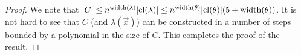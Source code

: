 \documentclass[../paper.tex]{subfiles}
\begin{document}
\begin{proof}
We note that $\vert C \vert \leq n^{\mathrm{width}(\lambda)} \vert \mathrm{cl}(\lambda) \vert
\leq n^{\mathrm{width}(\theta)} \vert \mathrm{cl}(\theta) \vert (5 + \mathrm{width}(\theta))$. It is not
hard to see that $C$ (and $\lambda(\vec{x})$) can be constructed in a number of
steps bounded by a polynomial in the size of $C$. This completes the proof of
the result.






  




\end{proof}
\end{document}
